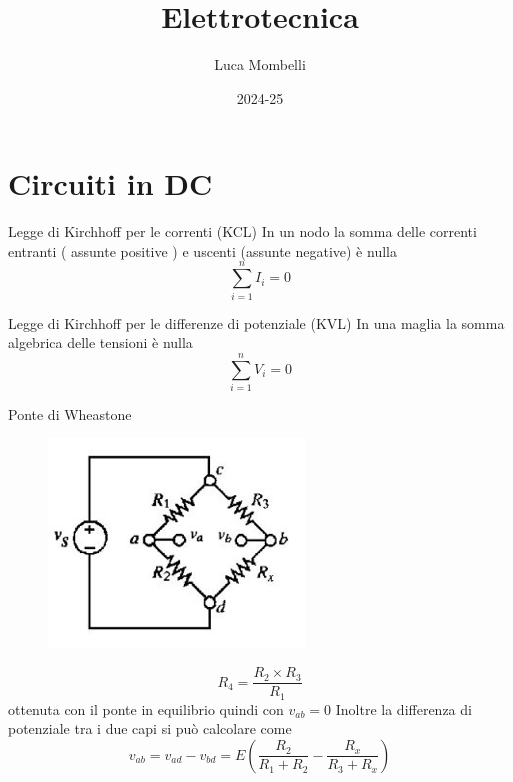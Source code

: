 \documentclass{article}
\title{Elettrotecnica }
\author{Luca Mombelli}
\date{2024-25}
\theoremstyle{definition}
\begin{document}
	\maketitle
		\tableofcontents
	\newpage
	\section{Circuiti in DC}
\begin{teo*}{Legge di Kirchhoff per le correnti (KCL)}
	In un nodo la somma delle correnti entranti ( assunte positive ) e uscenti (assunte negative) è nulla
	\begin{equation}
    \sum_{i=1}^n I_i = 0
    \end{equation}
\end{teo*}
\begin{teo*}{Legge di Kirchhoff per le differenze di potenziale (KVL)}
	In una maglia la somma algebrica delle tensioni è nulla 
	\begin{equation}
    \sum_{i=1}^n V_i = 0
    \end{equation}
\end{teo*}
Ponte di Wheastone 
\begin{figure}[h]
	\centering
	\includegraphics[scale=0.40]{immagini/ponte}
	\caption{}
	\label{fig:ponte-di-wheatstone-500x400}
\end{figure}
$$R_4=\frac{R_2 \times R_3}{R_1}$$ ottenuta con il ponte in equilibrio quindi con $v_{ab}=0$
Inoltre la differenza di potenziale tra i due capi si può calcolare come 
$$v_{ab}=v_{ad}-v_{bd}=E\left( \frac{R_2}{R_1+R_2}-\frac{R_x}{R_3+R_x}\right) $$
\end{document}
